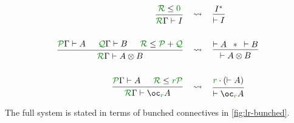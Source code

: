 \begin{align*}
  \begin{prooftree}
    \hypo{\grR \leq \gr0}
    \infer1{\grR\Gamma \vdash I}
  \end{prooftree}
  &\quad\rightsquigarrow\quad
  \begin{prooftree}
    \set{separation=0.75em}
    \hypo{I^*}
    \infer1{\vdash I}
  \end{prooftree}
  \\\\
  \begin{prooftree}
    \hypo{\grP\Gamma \vdash A}
    \hypo{\grQ\Gamma \vdash B}
    \hypo{\grR \leq \grP + \grQ}
    \infer3{\grR\Gamma \vdash A \otimes B}
  \end{prooftree}
  &\quad\rightsquigarrow\quad
  \begin{prooftree}
    \set{separation=0.75em}
    \hypo{\vdash A}
    \hypo{\sep}
    \hypo{\vdash B}
    \infer3{\vdash A \otimes B}
  \end{prooftree}
  \\\\
  \begin{prooftree}
    \hypo{\grP\Gamma \vdash A}
    \hypo{\grR \leq \gr r\grP}
    \infer2{\grR\Gamma \vdash \oc_{\gr r} A}
  \end{prooftree}
  &\quad\rightsquigarrow\quad
  \begin{prooftree}
    \set{separation=0.75em}
    \hypo{\gr r \cdot (\vdash A)}
    \infer1{\vdash \oc_{\gr r} A}
  \end{prooftree}
\end{align*}

The full system \name{} is stated in terms of bunched connectives in
\cref{fig:lr-bunched}.

